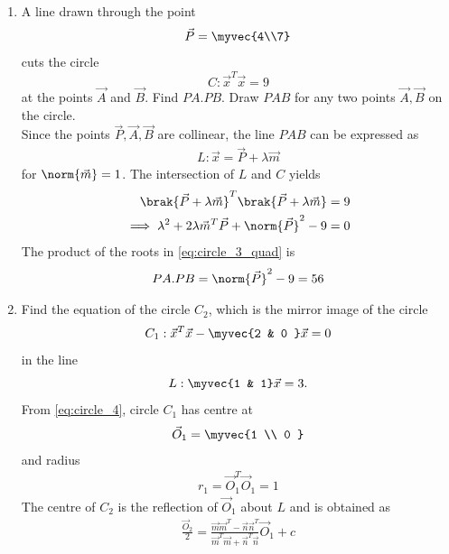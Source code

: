 \begin{enumerate}[label=\arabic*.,ref=\thesubsection.\theenumi]
\item A line drawn through the point 
\begin{equation}
\label{eq:circle_3_p}
\vec{P} = \myvec{4\\7} 
\end{equation}
cuts the circle
\begin{equation}
\label{eq:circle_3}
C: \vec{x}^T\vec{x}  = 9
\end{equation}
at the points $\vec{A}$ and $\vec{B}$. Find $PA.PB$. Draw $PAB$ for any two points $\vec{A},\vec{B}$ on the circle.
\\
\solution Since the points $\vec{P},\vec{A},\vec{B}$ are collinear, the line $PAB$ can be expressed as
\begin{align}
L: \vec{x} = \vec{P} + \lambda \vec{m}
\label{eq:circle_3_pab}
\end{align}
%
for $\norm{\vec{m}} = 1$. The intersection of $L$ and $C$  yields
\begin{align}
\brak{\vec{P}+ \lambda \vec{m}}^T
\brak{\vec{P} + \lambda \vec{m}} &= 9
\nonumber \\
\implies \lambda^2 + 2\lambda \vec{m}^T\vec{P} + \norm{\vec{P}}^2-9 &= 0
\label{eq:circle_3_quad}
\end{align}
%
The product of the roots in \eqref{eq:circle_3_quad} is 
\begin{align}
\label{eq:circle_3_prod}
PA.PB =\norm{\vec{P}}^2-9 = 56
\end{align}
%
\item Find the equation of the circle $C_2$, which is the mirror image of the circle
\begin{equation}
C_1: 
\vec{x}^T\vec{x} -\myvec{2 & 0 }\vec{x} = 0
\label{eq:circle_4}
\end{equation}
in the line
\begin{equation}
L: \myvec{1 & 1}\vec{x} = 3.
\label{eq:circle_4_line}
\end{equation}
\solution From  \eqref{eq:circle_4}, circle $C_1$ has centre at 
\begin{align}
\label{eq:circle_4_o1}
\vec{O}_1 = \myvec{1 \\ 0 }
\end{align}
%
and radius 
\begin{align}
\label{eq:circle_4_r1}
r_1 = \vec{O}_1^T\vec{O}_1 = 1
\end{align}
%
The centre of $C_2$ is the reflection of $\vec{O}_1$ about $L$ and is obtained as 
\begin{align}
\label{eq:circle_4_o2}
\frac{\vec{O}_2}{2} = \frac{\vec{m}\vec{m}^T-\vec{n}\vec{n}^T}{\vec{m}^T\vec{m}+\vec{n}^T\vec{n}}\vec{O}_1 + c 

\end{align}
\end{enumerate}
